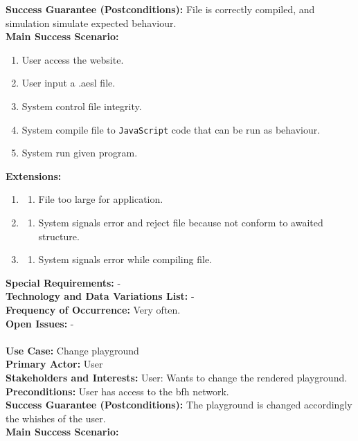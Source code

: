 \documentclass{scrbook}
\begin{document}
\textbf{Success Guarantee (Postconditions): }File is correctly compiled, and simulation simulate expected behaviour. \\
\textbf{Main Success Scenario: }
\begin{enumerate}
  \item User access the website.
  \item User input a .aesl file.
  \item System control file integrity.
  \item System compile file to \texttt{JavaScript} code that can be run as behaviour.
  \item System run given program.
\end{enumerate}
\textbf{Extensions: }
\begin{enumerate}\addtocounter{enumi}{1}
  \item 
  \begin{enumerate}
    \item File too large for application.
  \end{enumerate}
  \item
  \begin{enumerate}
    \item System signals error and reject file because not conform to awaited structure.
  \end{enumerate}
  \item 
  \begin{enumerate}
    \item System signals error while compiling file.
  \end{enumerate}
\end{enumerate}
\textbf{Special Requirements: }- \\
\textbf{Technology and Data Variations List: }- \\
\textbf{Frequency of Occurrence: }Very often. \\
\textbf{Open Issues: }- \\
\\
\textbf{Use Case: }Change playground \\
\textbf{Primary Actor: }User \\
\textbf{Stakeholders and Interests: }User: Wants to change the rendered playground. \\
\textbf{Preconditions: }User has access to the bfh network. \\
\textbf{Success Guarantee (Postconditions): }The playground is changed accordingly the whishes of the user. \\
\textbf{Main Success Scenario: }
\end{document}
